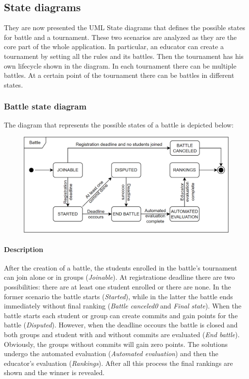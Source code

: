 \documentclass[12pt, a4paper]{report}
\begin{document}
    \subsection{State diagrams}
    They are now presented the UML State diagrams that defines the possible states for battle and a tournament. 
    These two scenarios are analyzed as they are the core part of the whole application.
    In particular, an educator can create a tournament by setting all the rules and its battles. 
    Then the tournament has his own lifecycle shown in the diagram. 
    In each tournament there can be multiple battles. 
    At a certain point of the tournament there can be battles in different states. 
    
    \subsubsection{Battle state diagram}
    The diagram that represents the possible states of a battle is depicted below: 
    \begin{figure}[H]
        \centering
        \includegraphics[width=0.75\linewidth]{images/battle.png}
    \end{figure}

    \paragraph*{Description}
    After the creation of a battle, the students enrolled in the battle's tournament can join alone or in groups (\textit{Joinable}). 
    At registratione deadline there are two possibilities: there are at least one student enrolled or there are none. 
    In the former scenario the battle starts (\textit{Started}), while in the latter the battle ends immediately without final ranking (\textit{Battle canceled0} and \textit{Final state}). 
    When the battle starts each student or group can create commits and gain points for the battle (\textit{Disputed}).
    However, when the deadline occours the battle is closed and both groups and student with and without commits are evaluated (\textit{End battle}). 
    Obviously, the groups without commits will gain zero points. 
    The solutions undergo the automated evaluation (\textit{Automated evaluation}) and then the educator's evaluation (\textit{Rankings}). 
    After all this process the final rankings are shown and the winner is revealed. 
\end{document}
